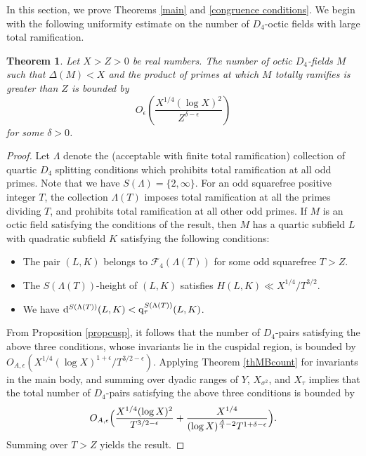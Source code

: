 \documentclass[10pt]{article}
\theoremstyle{plain}
\newtheorem{thm}{Theorem}[section]
\theoremstyle{definition}
\theoremstyle{remark}
\def\FF{{\mathcal F}}
\newcommand{\D}{{\rm d}}
\newcommand{\q}{{\rm q}}
\begin{document}
In this section, we prove Theorems \ref{main} and \ref{congruence
  conditions}. We begin with the following uniformity estimate on the
number of $D_4$-octic fields with large total ramification.
\begin{thm}\label{thunif}
Let $X>Z>0$ be real numbers. The number of octic $D_4$-fields $M$ such
that $\Delta(M)<X$ and the product of primes at which $M$ totally
ramifies is greater than $Z$ is bounded by $$O_\epsilon\left(\frac{X^{1/4}(\log
X)^2}{Z^{\delta-\epsilon}}\right)$$ for some $\delta > 0$.
\end{thm}
\begin{proof}
Let $\Lambda$ denote the (acceptable with finite total ramification)
collection of quartic $D_4$ splitting conditions which prohibits total
ramification at all odd primes. Note that we have
$S(\Lambda)=\{2,\infty\}$. For an odd squarefree positive integer $T$,
the collection $\Lambda(T)$ imposes total ramification at all the
primes dividing $T$, and prohibits total ramification at all other odd
primes. If $M$ is an octic field satisfying the conditions of the
result, then $M$ has a quartic subfield $L$ with quadratic subfield
$K$ satisfying the following conditions:
\begin{itemize}
\item[{\rm (a)}] The pair $(L,K)$ belongs to $\FF_4(\Lambda(T))$ for
  some odd squarefree $T>Z$.
\item[{\rm (b)}] The $S(\Lambda(T))$-height of $(L,K)$ satisfies
  $H(L,K)\ll X^{1/4}/T^{3/2}$.
\item[{\rm (c)}] We have
  $\D^{S(\Lambda(T))}(L,K)<\q_\tau^{S(\Lambda(T))}(L,K)$.
\end{itemize}
From Proposition \ref{propcusp}, it follows that the number of
$D_4$-pairs satisfying the above three conditions, whose invariants lie
in the cuspidal region, is bounded by $O_{A,\epsilon}(X^{1/4}(\log
X)^{1+\epsilon}/T^{3/2-\epsilon})$. Applying Theorem \ref{thMBcount}
for invariants in the main body, and summing over dyadic ranges of
$Y$, $X_{\sigma^2}$, and $X_\tau$ implies that the total number of
$D_4$-pairs satisfying the above three conditions is bounded by
\begin{equation*}
  O_{A,\epsilon}\Bigl(\frac{X^{1/4}(\log X)^{2}}{T^{3/2-\epsilon}}+
  \frac{X^{1/4}}{(\log X)^{\frac{A}{4}-2}T^{1+\delta-\epsilon}}\Bigr).
\end{equation*}
Summing over $T>Z$ yields the result.
\end{proof}
\end{document}
